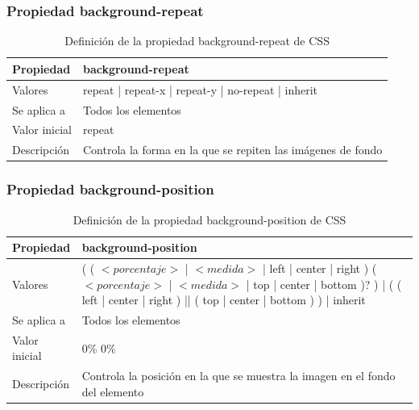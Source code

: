 \begin{frame}
\frametitle{Propiedad background-repeat}

\begin{center}
  \begin{table}
   \begin{tabular}{p{1.8cm}p{7.8cm}}
Propiedad & \bf{background-repeat} \\ \hline
Valores& repeat | repeat-x | repeat-y | no-repeat | inherit \\ \hline
Se aplica a& Todos los elementos \\ \hline
Valor inicial& repeat \\ \hline
Descripción& Controla la forma en la que se repiten las imágenes de fondo \\ \hline
  \end{tabular}
   \caption{Definición de la propiedad background-repeat de CSS}
 \end{table}
\end{center}


\end{frame}



\begin{frame}
\frametitle{Propiedad background-position}

\begin{center}
  \begin{table}
   \begin{tabular}{p{1.8cm}p{7.8cm}}
Propiedad & \bf{background-position} \\ \hline
Valores& ( ( $<porcentaje>$ | $<medida>$ | left | center | right ) ( $<porcentaje>$ | $<medida>$ | top | center | bottom )? ) | ( ( left | center | right ) || ( top | center | bottom ) ) | inherit \\ \hline
Se aplica a& Todos los elementos \\ \hline
Valor inicial& 0\% 0\% \\ \hline
Descripción& Controla la posición en la que se muestra la imagen en el fondo del elemento \\ \hline
  \end{tabular}
   \caption{Definición de la propiedad background-position de CSS}
 \end{table}
\end{center}


\end{frame}



